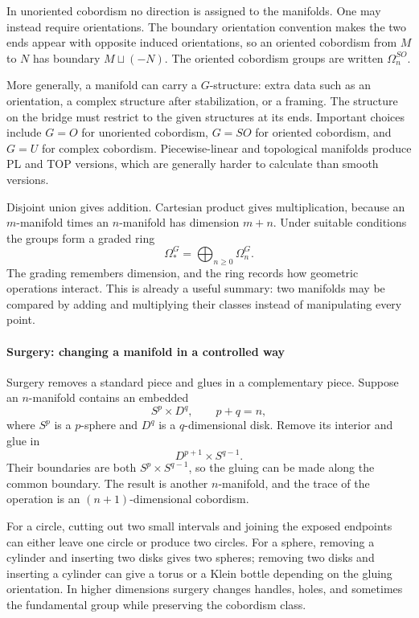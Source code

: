 In unoriented cobordism no direction is assigned to the manifolds. One may instead require orientations. The boundary orientation convention makes the two ends appear with opposite induced orientations, so an oriented cobordism from $M$ to $N$ has boundary $M\sqcup(-N)$. The oriented cobordism groups are written $\Omega_n^{SO}$.

More generally, a manifold can carry a $G$-structure: extra data such as an orientation, a complex structure after stabilization, or a framing. The structure on the bridge must restrict to the given structures at its ends. Important choices include $G=O$ for unoriented cobordism, $G=SO$ for oriented cobordism, and $G=U$ for complex cobordism. Piecewise-linear and topological manifolds produce PL and TOP versions, which are generally harder to calculate than smooth versions. \cite{cobordism_theory_ref3,cobordism_theory_ref6}

Disjoint union gives addition. Cartesian product gives multiplication, because an $m$-manifold times an $n$-manifold has dimension $m+n$. Under suitable conditions the groups form a graded ring
\[
 \Omega_*^G=\bigoplus_{n\geq 0}\Omega_n^G.
\]
The grading remembers dimension, and the ring records how geometric operations interact. This is already a useful summary: two manifolds may be compared by adding and multiplying their classes instead of manipulating every point.

\paragraph{Surgery: changing a manifold in a controlled way}

Surgery removes a standard piece and glues in a complementary piece. Suppose an $n$-manifold contains an embedded
\[
 S^p\times D^q,\qquad p+q=n,
\]
where $S^p$ is a $p$-sphere and $D^q$ is a $q$-dimensional disk. Remove its interior and glue in
\[
 D^{p+1}\times S^{q-1}.
\]
Their boundaries are both $S^p\times S^{q-1}$, so the gluing can be made along the common boundary. The result is another $n$-manifold, and the trace of the operation is an $(n+1)$-dimensional cobordism.

For a circle, cutting out two small intervals and joining the exposed endpoints can either leave one circle or produce two circles. For a sphere, removing a cylinder and inserting two disks gives two spheres; removing two disks and inserting a cylinder can give a torus or a Klein bottle depending on the gluing orientation. In higher dimensions surgery changes handles, holes, and sometimes the fundamental group while preserving the cobordism class. \cite{cobordism_theory_ref1,cobordism_theory_ref7}

